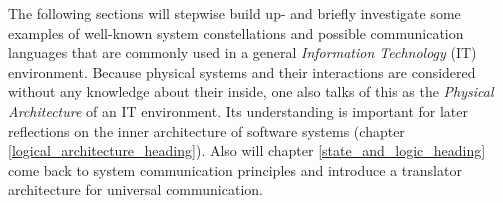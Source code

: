 The following sections will stepwise build up- and briefly investigate some
examples of well-known system constellations and possible communication
languages that are commonly used in a general \emph{Information Technology}
(IT) environment. Because physical systems and their interactions are
considered without any knowledge about their inside, one also talks of this as
the \emph{Physical Architecture} of an IT environment. Its understanding is
important for later reflections on the inner architecture of software systems
(chapter \ref{logical_architecture_heading}). Also will chapter
\ref{state_and_logic_heading} come back to system communication principles and
introduce a translator architecture for universal communication.














